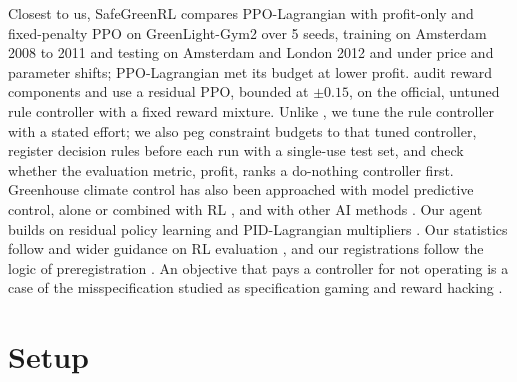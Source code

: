 \documentclass[letterpaper]{article} %
\begin{document}
Closest to us, SafeGreenRL \cite{sharma2026safegreenrl} compares PPO-Lagrangian with profit-only and fixed-penalty PPO on GreenLight-Gym2 over 5 seeds, training on Amsterdam 2008 to 2011 and testing on Amsterdam and London 2012 and under price and parameter shifts; PPO-Lagrangian met its budget at lower profit. \citet{bie2026calibration} audit reward components and use a residual PPO, bounded at $\pm 0.15$, on the official, untuned rule controller with a fixed reward mixture. Unlike \citet{bie2026calibration}, we tune the rule controller with a stated effort; we also peg constraint budgets to that tuned controller, register decision rules before each run with a single-use test set, and check whether the evaluation metric, profit, ranks a do-nothing controller first. Greenhouse climate control has also been approached with model predictive control, alone or combined with RL \cite{morcego2023rlmpc,mallick2025rlmpc,msaad2025rlguided}, and with other AI methods \cite{hemming2019remote,hemming2020cherry,cao2022igrow,liu2025greenhouse}. Our agent builds on residual policy learning \cite{silver2018residual,johannink2019residual} and PID-Lagrangian multipliers \cite{stooke2020pid}. Our statistics follow \citet{agarwal2021precipice} and wider guidance on RL evaluation \cite{henderson2018matters,engstrom2020implementation,patterson2024empirical}, and our registrations follow the logic of preregistration \cite{nosek2018preregistration}. An objective that pays a controller for not operating is a case of the misspecification studied as specification gaming and reward hacking \cite{krakovna2020specgaming,skalse2022reward,amodei2016concrete}.

\section{Setup}
\end{document}

